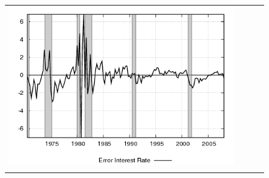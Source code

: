 \begin{figure}
\begin{tabular}{cccc}
\includegraphics[scale=0.22]{results_reinit/fedfunds_err.png} \\ \\ 
 

\end{tabular}
\end{figure}
